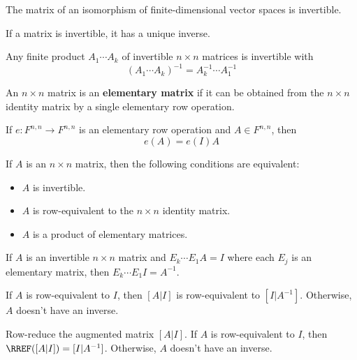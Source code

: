 \begin{lemma}
  The matrix of an isomorphism of finite-dimensional vector spaces is invertible.
\end{lemma}

\begin{lemma}
  If a matrix is invertible, it has a unique inverse.
\end{lemma}

\begin{lemma}
  Any finite product $A_1 \cdots A_k$ of invertible $n \times n$ matrices is invertible with
  \[
    (A_1 \cdots A_k)^{-1} = A_k^{-1} \cdots A_1^{-1}
  \]
\end{lemma}

\begin{definition}
  An $n \times n$ matrix is an \textbf{elementary matrix} if it can be obtained from the $n \times n$ identity matrix by a single elementary row operation.
\end{definition}

\begin{theorem}
  If $e : F^{n,n} \to F^{n,n}$ is an elementary row operation and $A \in F^{n,n}$, then
  \[
    e(A) = e(I) A
  \]
\end{theorem}

\begin{namedtheorem}
  If $A$ is an $n \times n$ matrix, then the following conditions are equivalent:
  \begin{itemize}
    \item $A$ is invertible.
    \item $A$ is row-equivalent to the $n \times n$ identity matrix.
    \item $A$ is a product of elementary matrices.
  \end{itemize}
\end{namedtheorem}

\begin{theorem}
  If $A$ is an invertible $n \times n$ matrix and $E_k \cdots E_1 A = I$ where each $E_j$ is an elementary matrix, then $E_k \cdots E_1 I = A^{-1}$.
\end{theorem}

\begin{lemma}
  If $A$ is row-equivalent to $I$, then $[A | I]$ is row-equivalent to $[I | A^{-1}]$. Otherwise, $A$ doesn't have an inverse.
\end{lemma}

\begin{procedure}[Computation of $A^{-1}$]
  Row-reduce the augmented matrix $[A | I]$. If $A$ is row-equivalent to $I$, then $\RREF([A | I]) = [I | A^{-1}]$. Otherwise, $A$ doesn't have an inverse.
\end{procedure}

